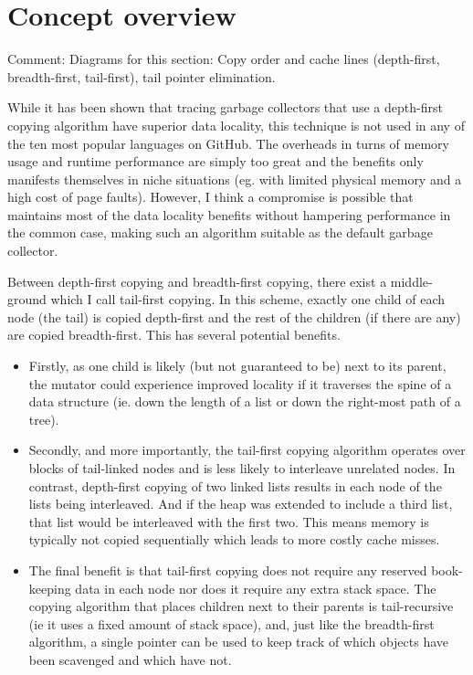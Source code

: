 \documentclass[a4paper,oneside]{memoir}
\newcommand{\makecomment}[1]{{\color{red} Comment: #1}}
\begin{document}
\section{Concept overview}

\makecomment{Diagrams for this section: Copy order and cache lines (depth-first,
breadth-first, tail-first), tail pointer elimination.}

While it has been shown that tracing garbage collectors that use a depth-first
copying algorithm have superior data locality, this technique is not used in any
of the ten most popular languages on GitHub. The overheads in turns of memory
usage and runtime performance are simply too great and the benefits only
manifests themselves in niche situations (eg. with limited physical memory and
a high cost of page faults). However, I think a compromise is possible that
maintains most of the data locality benefits without hampering performance in
the common case, making such an algorithm suitable as the default garbage
collector.

Between depth-first copying and breadth-first copying, there exist a middle-ground
which I call tail-first copying. In this scheme, exactly one child of each node
(the tail) is copied depth-first and the rest of the children (if there are any)
are copied breadth-first. This has several potential benefits.
\begin{itemize}
  \item
  Firstly, as one
  child is likely (but not guaranteed to be) next to its parent, the mutator could
  experience improved locality if it traverses the spine of a data structure (ie.
  down the length of a list or down the right-most path of a tree).
  \item
  Secondly, and
  more importantly, the tail-first copying algorithm operates over blocks of
  tail-linked nodes and is less likely to interleave unrelated nodes. In contrast,
  depth-first copying of two linked lists results in each node of the lists being
  interleaved. And if the heap was extended to include a third list, that list
  would be interleaved with the first two. This means memory is typically not
  copied sequentially which leads to more costly cache misses.
  \item
  The final benefit
  is that tail-first copying does not require any reserved book-keeping data in
  each node nor does it require any extra stack space. The copying algorithm that
  places children next to their parents is tail-recursive (ie it uses a fixed
  amount of stack space), and, just like the breadth-first algorithm, a single
  pointer can be used to keep track of which objects have been scavenged and which
  have not.
\end{itemize}
\end{document}
